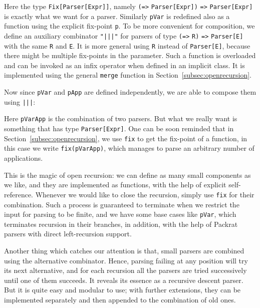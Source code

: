 
Here the type \lstinline{Fix[Parser[Expr]]}, namely \lstinline{(=>} \lstinline{Parser[Expr])} \lstinline{=>} \lstinline{Parser[Expr]} is exactly what we want for a parser. Similarly \lstinline{pVar} is redefined also as a function using the explicit fix-point \lstinline{p}. To be more convenient for composition, we define an auxiliary combinator \lstinline{"|||"} for parsers of type \lstinline{(=>} \lstinline{R)} \lstinline{=>} \lstinline{Parser[E]} with the same \lstinline{R} and \lstinline{E}. It is more general using \lstinline{R} instead of \lstinline{Parser[E]}, because there might be multiple fix-points in the parameter. Such a function is overloaded and can be invoked as an infix operator when defined in an implicit class. It is implemented using the general \lstinline{merge} function in Section~\ref{subsec:openrecursion}.


Now since \lstinline{pVar} and \lstinline{pApp} are defined independently, we are able to compose them using \lstinline{|||}:


Here \lstinline{pVarApp} is the combination of two parsers. But what we really want is something that has type \lstinline{Parser[Expr]}. One can be soon reminded that in Section~\ref{subsec:openrecursion}, we use \lstinline{fix} to get the fix-point of a function, in this case we write \lstinline{fix(pVarApp)}, which manages to parse an arbitrary number of applications.

This is the magic of open recursion: we can define as many small components as we like, and they are implemented as functions, with the help of explicit self-reference. Whenever we would like to close the recursion, simply use \lstinline{fix} for their combination. Such a process is guaranteed to terminate when we restrict the input for parsing to be finite, and we have some base cases like \lstinline{pVar}, which terminates recursion in their branches, in addition, with the help of Packrat parsers with direct left-recursion support.

Another thing which catches our attention is that, small parsers are combined using the alternative combinator. Hence, parsing failing at any position will try its next alternative, and for each recursion all the parsers are tried successively until one of them succeeds. It reveals its essence as a recursive descent parser. But it is quite easy and modular to use; with further extensions, they can be implemented separately and then appended to the combination of old ones.

